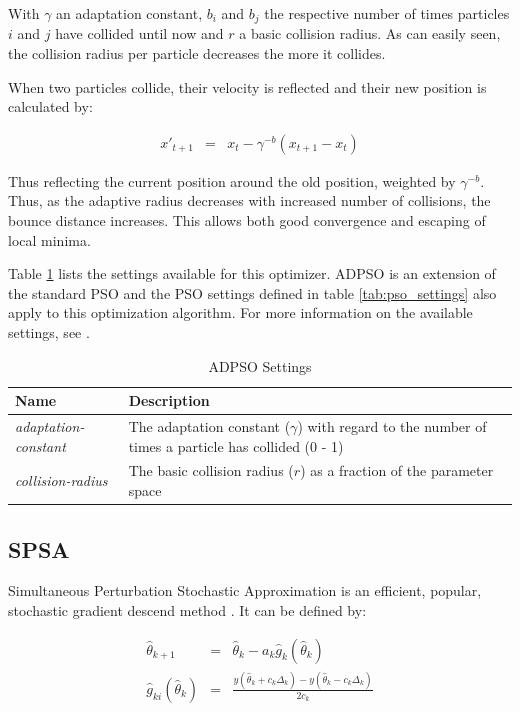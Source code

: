 \documentclass{report}
\begin{document}
With $\gamma$ an adaptation constant, $b_i$ and $b_j$ the respective number
of times particles $i$ and $j$ have collided until now and $r$ a basic collision
radius. As can easily seen, the collision radius per particle decreases
the more it collides.

When two particles collide, their velocity is reflected and their new position
is calculated by:

\begin{eqnarray*}
	x'_{t + 1} & = & x_t - \gamma^{-b}(x_{t + 1} - x_{t})
\end{eqnarray*}

Thus reflecting the current position around the old position, weighted by
$\gamma^{-b}$. Thus, as the adaptive radius decreases with increased number
of collisions, the bounce distance increases. This allows both good convergence
and escaping of local minima.

Table \ref{tab:adpso_settings} lists the settings available for this optimizer.
ADPSO is an extension of the standard PSO and the PSO settings defined in
table \ref{tab:pso_settings} also apply to this optimization algorithm. For
more information on the available settings, see .

\begin{table}[h!tb]\caption{ADPSO Settings}\label{tab:adpso_settings}\vspace{0.1in}
	\centering

	\begin{tabular}{p{4cm} p{12cm}}
		\toprule
		\textbf{Name} & \textbf{Description} \\
		\midrule
		\textit{adaptation-constant} & The adaptation constant ($\gamma$) with regard to the number
		                      of times a particle has collided (0 - 1) \\
		\textit{collision-radius} & The basic collision radius ($r$) as a fraction of the
		                   parameter space \\
		\bottomrule
	\end{tabular}
\end{table}

\subsection{SPSA}
Simultaneous Perturbation Stochastic Approximation is an efficient,
popular, stochastic gradient descend method \cite{spall_multivariate_1992}. It
can be defined by:

\begin{eqnarray*}
	\hat{\theta}_{k + 1} & = & \hat{\theta}_k - a_k \hat{g}_k(\hat{\theta}_k) \\
	\hat{g}_{ki}(\hat{\theta}_k) & = & \frac{y(\hat{\theta}_k + c_k \Delta_k) -
	                                         y(\hat{\theta}_k - c_k \Delta_k)}{2 c_k}
\end{eqnarray*}
\end{document}
